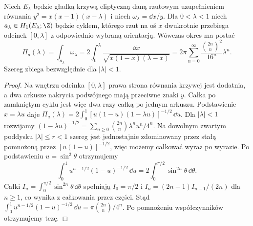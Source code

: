 \begin{stwierdzenie}
\label{prop:xv-legendre-period}
Niech $E_\lambda$ będzie gładką krzywą eliptyczną
daną rzutowym uzupełnieniem równania
$y^2=x(x-1)(x-\lambda)$ i niech
$\omega_\lambda=\dd x/y$. Dla $0<\lambda<1$
niech $a_\lambda\in H_1(E_\lambda;\Z)$ będzie cyklem,
którego rzut na oś $x$ dwukrotnie przebiega odcinek
$[0,\lambda]$ z odpowiednio wybraną orientacją.
Wówczas okres ma postać
\[
\Pi_a(\lambda)=\int_{a_\lambda}\omega_\lambda
=2\int_0^\lambda\frac{\dd x}
{\sqrt{x(1-x)(\lambda-x)}}
=2\pi\sum_{n=0}^\infty
\frac{\binom{2n}{n}^2}{16^n}\lambda^n.
\]
Szereg zbiega bezwzględnie dla $|\lambda|<1$.
\end{stwierdzenie}
\begin{proof}
Na wnętrzu odcinka $[0,\lambda]$ prawa strona równania
krzywej jest dodatnia, a dwa arkusze nakrycia podwójnego
mają przeciwne znaki $y$. Całka po zamkniętym cyklu
jest więc dwa razy całką po jednym arkuszu.
Podstawienie $x=\lambda u$ daje
$\Pi_a(\lambda)=2\int_0^1
[u(1-u)(1-\lambda u)]^{-1/2}\,\dd u$.
Dla $|\lambda|<1$ rozwijamy
$(1-\lambda u)^{-1/2}=
\sum_{n\ge0}\binom{2n}{n}\lambda^nu^n/4^n$.
Na dowolnym zwartym poddysku $|\lambda|\le r<1$
szereg jest jednostajnie zdominowany przez
stałą pomnożoną przez $[u(1-u)]^{-1/2}$,
więc możemy całkować wyraz po wyrazie.
Po podstawieniu $u=\sin^2\theta$
otrzymujemy
\[
\int_0^1 u^{n-1/2}(1-u)^{-1/2}\,\dd u
=2\int_0^{\pi/2}\sin^{2n}\theta\,\dd\theta.
\]
Całki $I_n=\int_0^{\pi/2}\sin^{2n}\theta\,\dd\theta$
spełniają $I_0=\pi/2$ i
$I_n=(2n-1)I_{n-1}/(2n)$ dla $n\ge1$,
co wynika z całkowania przez części.
Stąd
$\int_0^1 u^{n-1/2}(1-u)^{-1/2}\,\dd u
=\pi\binom{2n}{n}/4^n$.
Po pomnożeniu współczynników otrzymujemy tezę.
\end{proof}

